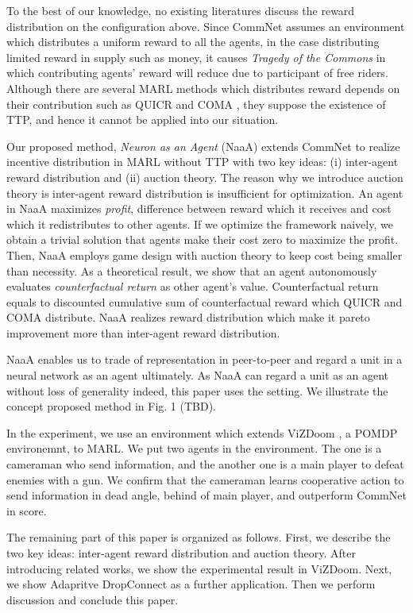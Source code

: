 To the best of our knowledge, no existing literatures discuss the reward distribution on the configuration above.
Since CommNet assumes an environment which distributes a uniform reward to all the agents, 
in the case distributing limited reward in supply such as money, it causes {\em Tragedy of the Commons} \citep{lloyd1833two} in which contributing agents' reward will reduce due to participant of free riders.
Although there are several MARL methods which distributes reward depends on their contribution such as QUICR \citep{agogino2006quicr} and COMA \citep{sukhbaatar2016learning}, they suppose the existence of TTP, and hence it cannot be applied into our situation.


Our proposed method, {\em Neuron as an Agent} (NaaA) extends CommNet to realize incentive distribution
in MARL without TTP with two key ideas: (i) inter-agent reward distribution and (ii) auction theory.
The reason why we introduce auction theory is inter-agent reward distribution is insufficient for optimization.
An agent in NaaA maximizes {\em profit}, difference between reward which it receives and cost which it redistributes to other agents.
If we optimize the framework naively, we obtain a trivial solution that agents make their cost zero to maximize the profit.
Then, NaaA employs game design with auction theory to keep cost being smaller than necessity.
As a theoretical result, we show that an agent autonomously evaluates {\em counterfactual return} as other agent's value.
Counterfactual return equals to discounted cumulative sum of counterfactual reward \citep{agogino2006quicr} which QUICR and COMA distribute.
NaaA realizes reward distribution which make it pareto improvement more than inter-agent reward distribution.

NaaA enables us to trade of representation in peer-to-peer and regard a unit in a neural network as an agent ultimately.
As NaaA can regard a unit as an agent without loss of generality indeed, this paper uses the setting.
We illustrate the concept proposed method in Fig. 1 (TBD).

In the experiment, we use an environment which extends ViZDoom \citep{kempka2016vizdoom}, a POMDP environemnt, to MARL.
We put two agents in the environment.
The one is a cameraman who send information, and the another one is a main player to defeat enemies with a gun.
We confirm that the cameraman learns cooperative action to send information in dead angle, behind of main player, and outperform CommNet in score.

The remaining part of this paper is organized as follows. 
First, we describe the two key ideas: inter-agent reward distribution and auction theory. 
After introducing related works, we show the experimental result in ViZDoom.
Next, we show Adapritve DropConnect as a further application. Then we perform discussion and conclude this paper.
